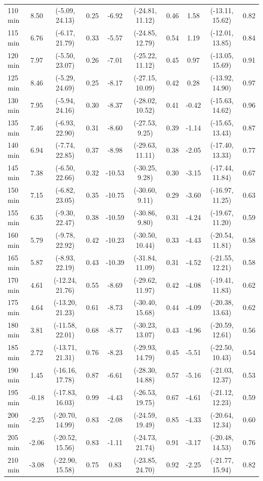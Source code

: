 \begin{table}[ht]
{\begin{tabular}{lccccccccc}
110 min & 8.50 & (-5.09, 24.13) & 0.25 & -6.92 & (-24.81, 11.12) & 0.46 & 1.58 & (-13.11, 15.62) & 0.82 \\
115 min & 6.76 & (-6.17, 21.79) & 0.33 & -5.57 & (-24.85, 12.79) & 0.54 & 1.19 & (-12.01, 13.85) & 0.84 \\
120 min & 7.97 & (-5.50, 23.07) & 0.26 & -7.01 & (-25.22, 11.12) & 0.45 & 0.97 & (-13.05, 15.69) & 0.91 \\
125 min & 8.46 & (-5.29, 24.69) & 0.25 & -8.17 & (-27.15, 10.09) & 0.42 & 0.28 & (-13.92, 14.90) & 0.97 \\
130 min & 7.95 & (-5.94, 24.16) & 0.30 & -8.37 & (-28.02, 10.52) & 0.41 & -0.42 & (-15.63, 14.62) & 0.96 \\
135 min & 7.46 & (-6.93, 22.90) & 0.31 & -8.60 & (-27.53, 9.25) & 0.39 & -1.14 & (-15.65, 13.43) & 0.87 \\
140 min & 6.94 & (-7.74, 22.85) & 0.37 & -8.98 & (-29.63, 11.11) & 0.38 & -2.05 & (-17.40, 13.33) & 0.77 \\
145 min & 7.38 & (-6.50, 22.66) & 0.32 & -10.53 & (-30.25, 9.28) & 0.30 & -3.15 & (-17.44, 11.84) & 0.67 \\
150 min & 7.15 & (-6.82, 23.05) & 0.35 & -10.75 & (-30.60, 9.11) & 0.29 & -3.60 & (-16.97, 11.25) & 0.63 \\
155 min & 6.35 & (-9.30, 22.47) & 0.38 & -10.59 & (-30.86, 9.80) & 0.31 & -4.24 & (-19.67, 11.20) & 0.59 \\
160 min & 5.79 & (-9.78, 22.92) & 0.42 & -10.23 & (-30.50, 10.44) & 0.33 & -4.43 & (-20.54, 11.81) & 0.58 \\
165 min & 5.87 & (-8.93, 22.19) & 0.43 & -10.39 & (-31.84, 11.09) & 0.31 & -4.52 & (-21.55, 12.21) & 0.58 \\
170 min & 4.61 & (-12.24, 21.76) & 0.55 & -8.69 & (-29.62, 11.97) & 0.42 & -4.08 & (-19.41, 11.83) & 0.62 \\
175 min & 4.64 & (-13.20, 21.23) & 0.61 & -8.73 & (-30.40, 15.68) & 0.44 & -4.09 & (-20.38, 13.63) & 0.62 \\
180 min & 3.81 & (-11.58, 22.01) & 0.68 & -8.77 & (-30.23, 13.07) & 0.43 & -4.96 & (-20.59, 12.61) & 0.56 \\
185 min & 2.72 & (-13.71, 21.31) & 0.76 & -8.23 & (-29.93, 14.79) & 0.45 & -5.51 & (-22.50, 10.43) & 0.54 \\
190 min & 1.45 & (-16.16, 17.78) & 0.87 & -6.61 & (-28.30, 14.88) & 0.57 & -5.16 & (-21.03, 12.37) & 0.53 \\
195 min & -0.18 & (-17.83, 16.03) & 0.99 & -4.43 & (-26.53, 19.75) & 0.67 & -4.61 & (-21.12, 12.23) & 0.59 \\
200 min & -2.25 & (-20.70, 14.99) & 0.83 & -2.08 & (-24.59, 19.49) & 0.85 & -4.33 & (-20.64, 12.34) & 0.60 \\
205 min & -2.06 & (-20.52, 15.56) & 0.83 & -1.11 & (-24.73, 21.74) & 0.91 & -3.17 & (-20.48, 14.53) & 0.76 \\
210 min & -3.08 & (-22.90, 15.58) & 0.75 & 0.83 & (-23.85, 24.70) & 0.92 & -2.25 & (-21.77, 15.94) & 0.82 \\
\bottomrule
\end{tabular}%
}
\end{table}
